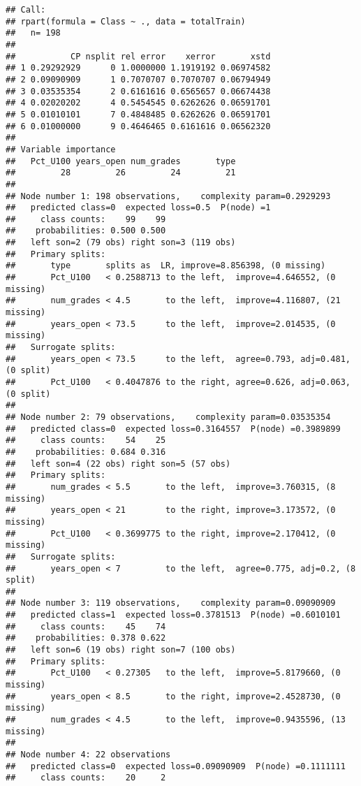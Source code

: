 \documentclass[
]{article}
\begin{document}
\begin{verbatim}
## Call:
## rpart(formula = Class ~ ., data = totalTrain)
##   n= 198 
## 
##           CP nsplit rel error    xerror       xstd
## 1 0.29292929      0 1.0000000 1.1919192 0.06974582
## 2 0.09090909      1 0.7070707 0.7070707 0.06794949
## 3 0.03535354      2 0.6161616 0.6565657 0.06674438
## 4 0.02020202      4 0.5454545 0.6262626 0.06591701
## 5 0.01010101      7 0.4848485 0.6262626 0.06591701
## 6 0.01000000      9 0.4646465 0.6161616 0.06562320
## 
## Variable importance
##   Pct_U100 years_open num_grades       type 
##         28         26         24         21 
## 
## Node number 1: 198 observations,    complexity param=0.2929293
##   predicted class=0  expected loss=0.5  P(node) =1
##     class counts:    99    99
##    probabilities: 0.500 0.500 
##   left son=2 (79 obs) right son=3 (119 obs)
##   Primary splits:
##       type       splits as  LR, improve=8.856398, (0 missing)
##       Pct_U100   < 0.2588713 to the left,  improve=4.646552, (0 missing)
##       num_grades < 4.5       to the left,  improve=4.116807, (21 missing)
##       years_open < 73.5      to the left,  improve=2.014535, (0 missing)
##   Surrogate splits:
##       years_open < 73.5      to the left,  agree=0.793, adj=0.481, (0 split)
##       Pct_U100   < 0.4047876 to the right, agree=0.626, adj=0.063, (0 split)
## 
## Node number 2: 79 observations,    complexity param=0.03535354
##   predicted class=0  expected loss=0.3164557  P(node) =0.3989899
##     class counts:    54    25
##    probabilities: 0.684 0.316 
##   left son=4 (22 obs) right son=5 (57 obs)
##   Primary splits:
##       num_grades < 5.5       to the left,  improve=3.760315, (8 missing)
##       years_open < 21        to the right, improve=3.173572, (0 missing)
##       Pct_U100   < 0.3699775 to the right, improve=2.170412, (0 missing)
##   Surrogate splits:
##       years_open < 7         to the left,  agree=0.775, adj=0.2, (8 split)
## 
## Node number 3: 119 observations,    complexity param=0.09090909
##   predicted class=1  expected loss=0.3781513  P(node) =0.6010101
##     class counts:    45    74
##    probabilities: 0.378 0.622 
##   left son=6 (19 obs) right son=7 (100 obs)
##   Primary splits:
##       Pct_U100   < 0.27305   to the left,  improve=5.8179660, (0 missing)
##       years_open < 8.5       to the right, improve=2.4528730, (0 missing)
##       num_grades < 4.5       to the left,  improve=0.9435596, (13 missing)
## 
## Node number 4: 22 observations
##   predicted class=0  expected loss=0.09090909  P(node) =0.1111111
##     class counts:    20     2

\end{verbatim}
\end{document}
